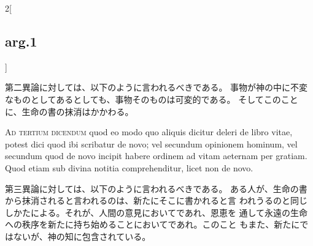 \documentclass[paper=a4paper,fontsize=10pt,jafontsize=9pt,titlepage]{jlreq}
\begin{document}
\begin{paracol}{2}[\subsection{arg.1}]
\switchcolumn

第二異論に対しては、以下のように言われるべきである。
事物が神の中に不変なものとしてあるとしても、事物そのものは可変的である。
 そしてこのことに、生命の書の抹消はかかわる。

\switchcolumn*[\subsection{ad.3}]

{\scshape Ad tertium dicendum} quod eo modo quo aliquis
dicitur deleri de libro vitae, potest dici quod ibi scribatur de novo;
vel secundum opinionem hominum, vel secundum quod de novo incipit habere
ordinem ad vitam aeternam per gratiam. Quod etiam sub divina notitia
comprehenditur, licet non de novo.

\switchcolumn

第三異論に対しては、以下のように言われるべきである。
ある人が、生命の書から抹消されると言われるのは、新たにそこに書かれると言
 われうるのと同じしかたによる。それが、人間の意見においてであれ、恩恵を
 通して永遠の生命への秩序を新たに持ち始めることにおいてであれ。このこと
 もまた、新たにではないが、神の知に包含されている。

\end{paracol}
\end{document}
